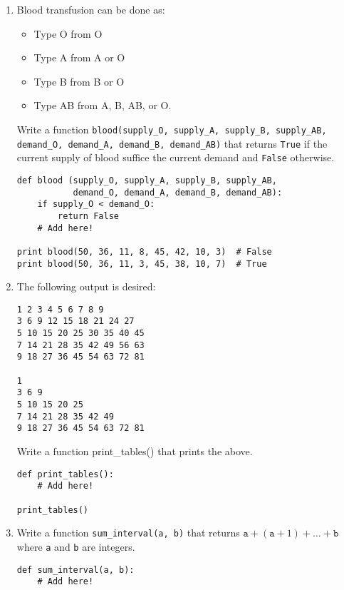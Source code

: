 \documentclass[../main.tex]{subfiles}
\begin{document}
\begin{enumerate}
\item Blood transfusion can be done as:
\begin{itemize}
\item Type O from O
\item Type A from A or O
\item Type B from B or O
\item Type AB from A, B, AB, or O.
\end{itemize}
Write a function \texttt{blood(supply\_O, supply\_A, supply\_B, supply\_AB, demand\_O, demand\_A, demand\_B, demand\_AB)} that returns \texttt{True} if the current supply of blood suffice the current demand and \texttt{False} otherwise.
\begin{verbatim}
def blood (supply_O, supply_A, supply_B, supply_AB,
           demand_O, demand_A, demand_B, demand_AB):
	if supply_O < demand_O:
		return False
	# Add here!

print blood(50, 36, 11, 8, 45, 42, 10, 3)  # False
print blood(50, 36, 11, 3, 45, 38, 10, 7)  # True
\end{verbatim}

\item The following output is desired:
\begin{verbatim}
1 2 3 4 5 6 7 8 9
3 6 9 12 15 18 21 24 27
5 10 15 20 25 30 35 40 45
7 14 21 28 35 42 49 56 63
9 18 27 36 45 54 63 72 81

1
3 6 9
5 10 15 20 25
7 14 21 28 35 42 49
9 18 27 36 45 54 63 72 81
\end{verbatim}
Write a function print\_tables() that prints the above.
\begin{verbatim}
def print_tables():
	# Add here!

print_tables()
\end{verbatim}

\item Write a function \texttt{sum\_interval(a, b)} that returns $\texttt{a} + (\texttt{a} + 1) + \dots + \texttt{b}$ where \texttt{a} and \texttt{b} are integers.
\begin{verbatim}
def sum_interval(a, b):
	# Add here!


\end{verbatim}
\end{enumerate}
\end{document}
